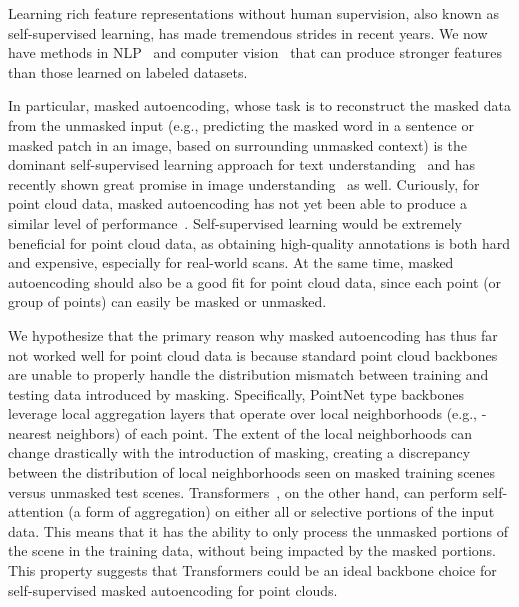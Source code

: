 \documentclass[runningheads]{llncs}
\begin{document}
Learning rich feature representations without human supervision, also known as self-supervised learning, has made tremendous strides in recent years. We now have methods in NLP~\cite{Radford2018-GPT,devlin-etal-2019-bert,radford2021learning} and computer vision~\cite{he2020momentum,pmlr-v119-chen20j,mae,chen2021exploring,bao2021beit} that can produce stronger features than those learned on labeled datasets.

In particular, masked autoencoding, whose task is to reconstruct the masked data from the unmasked input (e.g., predicting the masked word in a sentence or masked patch in an image, based on surrounding unmasked context) is the dominant self-supervised learning approach for text understanding~\cite{devlin-etal-2019-bert,joshi2020spanbert,Lan2020ALBERT,yang2019xlnet} and has recently shown great promise in image understanding~\cite{bao2021beit,mae} as well. Curiously, for point cloud data, masked autoencoding has not yet been able to produce a similar level of performance~\cite{occo,yu2021point,yan2022implicit}.  Self-supervised learning would be extremely beneficial for point cloud data, as obtaining high-quality annotations is both hard and expensive, especially for real-world scans.  At the same time, masked autoencoding should also be a good fit for point cloud data, since each point (or group of points) can easily be masked or unmasked. 

We hypothesize that the primary reason why masked autoencoding has thus far not worked well for point cloud data is because standard point cloud backbones are unable to properly handle the distribution mismatch between training and testing data introduced by masking.  Specifically, PointNet type backbones~\cite{qi2017pointnetplusplus,qi2019deep,qi2017pointnet} leverage local aggregation layers that operate over local neighborhoods (e.g., -nearest neighbors) of each point.  The extent of the local neighborhoods can change drastically with the introduction of masking, creating a discrepancy between the distribution of local neighborhoods seen on masked training scenes versus unmasked test scenes. Transformers~\cite{NIPS2017_3f5ee243}, on the other hand, can perform self-attention (a form of aggregation) on either all or selective portions of the input data.  This means that it has the ability to only process the unmasked portions of the scene in the training data, without being impacted by the masked portions.  This property suggests that Transformers could be an ideal backbone choice for self-supervised masked autoencoding for point clouds. 
\end{document}
